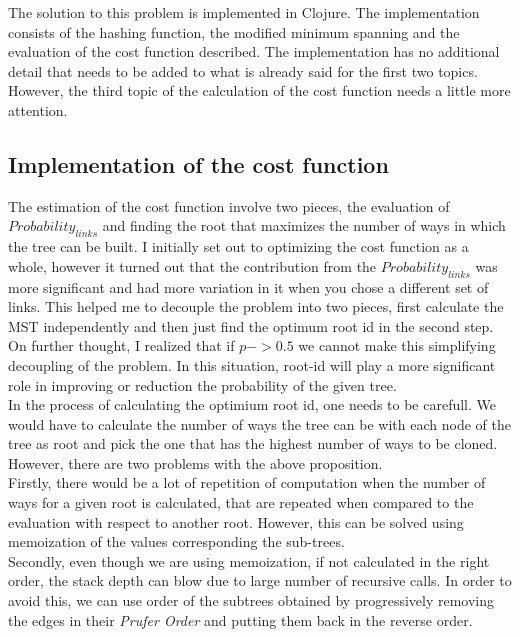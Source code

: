\documentclass[12pt]{article}
\begin{document}
The solution to this problem is implemented in Clojure. The implementation consists of the hashing function, the modified minimum spanning and the evaluation of the cost function described. The implementation has no additional detail that needs to be added to what is already said for the first two topics. However, the third topic of the calculation of the cost function needs a little more  attention.

\subsection{Implementation of the cost function}
The estimation of the cost function involve two pieces, the evaluation of $Probability_{links}$ and finding the root that maximizes the number of ways in which the tree can be built. I initially set out to optimizing the cost function as a whole, however it turned out that the contribution from the $Probability_{links}$ was more significant and had more variation in it when you chose a different set of links. This helped me to decouple the problem into two pieces, first calculate the MST independently and then just find the optimum root id in the second step. On further thought, I realized that if $p->0.5$ we cannot make this simplifying decoupling of the problem. In this situation, root-id will play a more significant role in improving or reduction the probability of the given tree.\\
In the process of calculating the optimium root id, one needs to be carefull. We would have to calculate the number of ways the tree can be with each node of the tree as root and pick the one that has the highest number of ways to be cloned. However, there are two problems with the above proposition. \\
 Firstly, there would be a lot of repetition of computation when the number of ways for a given root is calculated, that are repeated when compared to the evaluation with respect to another root. However, this can be solved using memoization of the values corresponding the sub-trees. \\
Secondly, even though we are using memoization, if not calculated in the right order, the stack depth can blow due to large number of recursive calls. In order to avoid this, we can use order of the subtrees obtained by progressively removing the edges in their \emph{Prufer Order} and putting them back in the reverse order.
\end{document}
